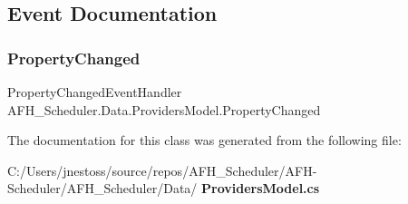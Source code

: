 \subsection{Event Documentation}
\mbox{\label{class_a_f_h___scheduler_1_1_data_1_1_providers_model_aac3272a84dd296b87222330490ca54eb}} 
\subsubsection{PropertyChanged}
{\footnotesize\ttfamily Property\+Changed\+Event\+Handler A\+F\+H\+\_\+\+Scheduler.\+Data.\+Providers\+Model.\+Property\+Changed}



The documentation for this class was generated from the following file\+:\begin{DoxyCompactItemize}
\item 
C\+:/\+Users/jnestoss/source/repos/\+A\+F\+H\+\_\+\+Scheduler/\+A\+F\+H-\/\+Scheduler/\+A\+F\+H\+\_\+\+Scheduler/\+Data/\textbf{ Providers\+Model.\+cs}\end{DoxyCompactItemize}
